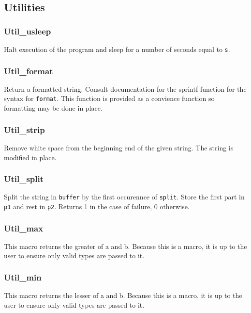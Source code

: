 \subsection{Utilities} \label{apiutilities}
\subsubsection{Util\_usleep} \label{apiutilsleep}
 Halt execution of the program and sleep for a
number of seconds equal to \texttt{s}. 

\subsubsection{Util\_format} \label{apiutilformat}
 Return a formatted string. Consult
documentation for the sprintf function for the syntax for \texttt{format}. This
function is provided as a convience function so formatting may be done in place.

\subsubsection{Util\_strip} \label{apiutilstrip}
 Remove white space from the beginning end
of the given string. The string is modified in place.

\subsubsection{Util\_split} \label{apiutilsplit}
 Split
the string in \texttt{buffer} by the first occurennce of \texttt{split}. Store
the first part in \texttt{p1} and rest in \texttt{p2}. Returns 1 in the case of
failure, 0 otherwise.

\subsubsection{Util\_max} \label{apiutilmax}
 This macro returns the greater of a and b. Because
this is a macro, it is up to the user to ensure only valid types are passed to
it.

\subsubsection{Util\_min} \label{apiutilmin}
 This macro returns the lesser of a and b. Because
this is a macro, it is up to the user to ensure only valid types are passed to
it.

